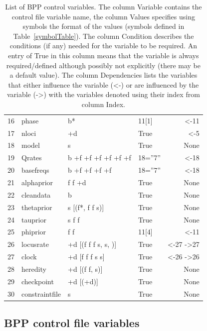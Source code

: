 \documentclass{book}
\numberwithin{equation}{section} \renewcommand{\baselinestretch}{0.55}
\begin{document}
\begin{table}[h]
\begin{center}
{\begin{tabular}{@{}llllr@{}}
      16 & {\color{green1} phase} & b* & 11[1] & <-11 \\
      17 & {\color{blue} nloci} & +d & True & <-5 \\
      18 & {\color{blue} model} & s & True & None \\
      19 & {\color{blue} Qrates} & b +f +f +f +f +f +f & 18=''7'' & <-18 \\
      20 & {\color{blue} basefreqs} & b +f +f +f +f & 18=''7'' & <-18 \\
      21 & {\color{blue} alphaprior} & f f +d & True & None \\
      22 & {\color{blue} cleandata} & b & True & None \\
      23 & {\color{red} thetaprior} & s [(f*, f f s)] & True & None \\
      24 & {\color{red} tauprior} & s f f & True & None \\
      25 & {\color{yellow1} phiprior} & f f & 11[4] & <-11 \\
      26 & {\color{blue} locusrate} & +d [(f f f s, s, )] & True & <-27 ->27 \\
      27 & {\color{blue} clock} & +d [f f f s s] & True & <-26 ->26 \\
      28 & {\color{blue} heredity} & +d [(f f, s)] & True & None \\
      29 & {\color{blue} checkpoint} & +d [(+d)] & True & None \\
      30 & {\color{blue} constraintfile} & s & True & None \\
      \bottomrule
    \end{tabular}
    }
    \caption{List of BPP control variables. The column Variable
      contains the control file variable name, the column Values
      specifies using symbols the format of the values (symbols
      defined in Table~\ref{symbolTable}). The column Condition
      describes the conditions (if any) needed for the variable to be
      required. An entry of True in this column means that the
      variable is always required/defined although possibly not
      explicitly (there may be a default value). The column
      Dependencies lists the variables that either influence the
      variable (<-) or are influenced by the variable (->) with the
      variables denoted using their index from column Index.}
    \label{variableTable}
  \end{center}
\end{table}
\newpage
\subsection{BPP control file variables} \label{controlfilevariables}
\end{document}
